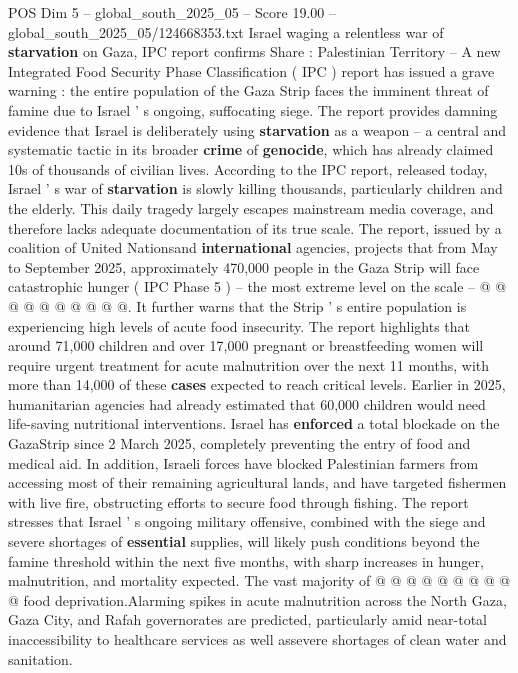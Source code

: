 \begin{textsample}{POS Dim 5 – global\_south\_2025\_05 – Score 19.00 – global\_south\_2025\_05/124668353.txt}  \label{ex:f5_pos_113}
Israel waging a relentless war of \textbf{starvation} on Gaza, IPC report confirms Share : Palestinian Territory -- A new Integrated Food Security Phase Classification ( IPC ) report has issued a grave warning : the entire population of the Gaza Strip faces the imminent threat of famine due to Israel ' s ongoing, suffocating siege.
The report provides damning evidence that Israel is deliberately using \textbf{starvation} as a weapon -- a central and systematic tactic in its broader \textbf{crime} of \textbf{genocide}, which has already claimed 10s of thousands of civilian lives.
According to the IPC report, released today, Israel ' s war of \textbf{starvation} is slowly killing thousands, particularly children and the elderly.
This daily tragedy largely escapes mainstream media coverage, and therefore lacks adequate documentation of its true scale.
The report, issued by a coalition of United Nationsand \textbf{international} agencies, projects that from May to September 2025, approximately 470,000 people in the Gaza Strip will face catastrophic hunger ( IPC Phase 5 ) -- the most extreme level on the scale -- @ @ @ @ @ @ @ @ @ @.
It further warns that the Strip ' s entire population is experiencing high levels of acute food insecurity.
The report highlights that around 71,000 children and over 17,000 pregnant or breastfeeding women will require urgent treatment for acute malnutrition over the next 11 months, with more than 14,000 of these \textbf{cases} expected to reach critical levels.
Earlier in 2025, humanitarian agencies had already estimated that 60,000 children would need life-saving nutritional interventions.
Israel has \textbf{enforced} a total blockade on the GazaStrip since 2 March 2025, completely preventing the entry of food and medical aid.
In addition, Israeli forces have blocked Palestinian farmers from accessing most of their remaining agricultural lands, and have targeted fishermen with live fire, obstructing efforts to secure food through fishing.
The report stresses that Israel ' s ongoing military offensive, combined with the siege and severe shortages of \textbf{essential} supplies, will likely push conditions beyond the famine threshold within the next five months, with sharp increases in hunger, malnutrition, and mortality expected.
The vast majority of @ @ @ @ @ @ @ @ @ @ food deprivation.Alarming spikes in acute malnutrition across the North Gaza, Gaza City, and Rafah governorates are predicted, particularly amid near-total inaccessibility to healthcare services as well assevere shortages of clean water and sanitation.

\end{textsample}

